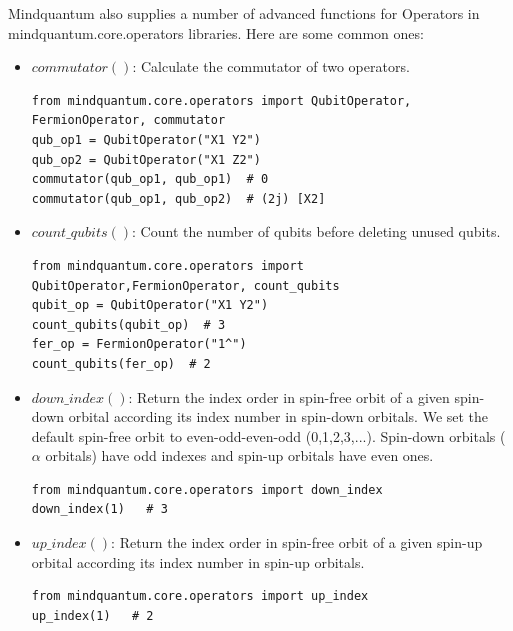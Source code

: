 Mindquantum also supplies a number of advanced functions for Operators in mindquantum.core.operators libraries. Here are some common ones:
\begin{itemize}
    \item $commutator()$: Calculate the commutator of two operators.
          \begin{lstlisting}
from mindquantum.core.operators import QubitOperator, FermionOperator, commutator
qub_op1 = QubitOperator("X1 Y2")
qub_op2 = QubitOperator("X1 Z2")
commutator(qub_op1, qub_op1)  # 0
commutator(qub_op1, qub_op2)  # (2j) [X2]
    \end{lstlisting}
    \item $count\_qubits()$: Count the number of qubits before deleting unused qubits.
          \begin{lstlisting}
from mindquantum.core.operators import QubitOperator,FermionOperator, count_qubits
qubit_op = QubitOperator("X1 Y2")
count_qubits(qubit_op)  # 3
fer_op = FermionOperator("1^")
count_qubits(fer_op)  # 2
    \end{lstlisting}
    \item $down\_index()$: Return the index order in spin-free orbit of a given spin-down orbital according its index number in spin-down orbitals. We set the default spin-free orbit to even-odd-even-odd (0,1,2,3,...). Spin-down orbitals ($\alpha$ orbitals) have odd indexes and spin-up orbitals have even ones.
          \begin{lstlisting}
from mindquantum.core.operators import down_index
down_index(1)   # 3
    \end{lstlisting}
    \item $up\_index()$: Return the index order in spin-free orbit of a given spin-up orbital according its index number in spin-up orbitals.
          \begin{lstlisting}
from mindquantum.core.operators import up_index
up_index(1)   # 2
    \end{lstlisting}
\end{itemize}
